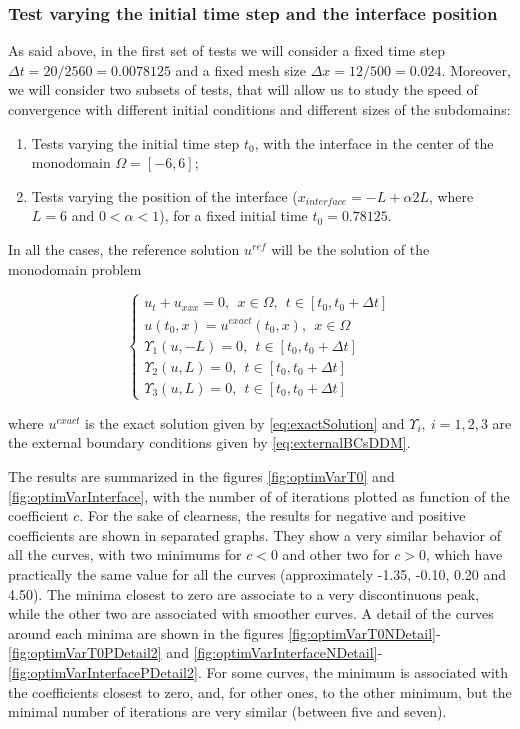 \subsubsection{Test varying the initial time step and the interface position}

\indent As said above, in the first set of tests we will consider a fixed time step $\Delta t = 20/2560 = 0.0078125$ and a fixed mesh size $\Delta x = 12/500 = 0.024$. Moreover, we will consider two subsets of tests, that will allow us to study the speed of convergence with different initial conditions and different sizes of the subdomains:

\begin{enumerate}
	\item Tests varying the initial time step $t_0$, with the interface in the center of the monodomain $\Omega = [-6,6]$;
	\item Tests varying the position of the interface ($x_{interface} = -L + \alpha 2L$, where $L = 6$ and $0 < \alpha < 1$), for a fixed initial time $t_0 = 0.78125$.
\end{enumerate}

\indent In all the cases, the reference solution $u^{ref}$ will be the solution of the monodomain problem

\begin{equation*}
	\begin{cases}
	u_t + u_{xxx} = 0, \ \ x \in \Omega, \ \ t \in [t_0, t_0+\Delta t] \\
	u(t_0,x) = u^{exact}(t_0,x) , \ \ x \in \Omega \\ 
	\Upsilon_1(u,-L) = 0, \ \ t \in [t_0, t_0+\Delta t] \\
	\Upsilon_2(u,L) = 0, \ \ t \in [t_0, t_0+\Delta t] \\
	\Upsilon_3(u,L) = 0, \ \ t \in [t_0, t_0+\Delta t]
	\end{cases}
\end{equation*}

\noindent where $u^{exact}$ is the exact solution given by \eqref{eq:exactSolution} and $\Upsilon_i , \ i =1,2,3$ are the external boundary conditions given by \eqref{eq:externalBCsDDM}.

\indent The results are summarized in the figures \ref{fig:optimVarT0} and \ref{fig:optimVarInterface}, with the number of of iterations plotted as function of the coefficient $c$. For the sake of clearness, the results for negative and positive coefficients are shown in separated graphs. They show a very similar behavior of all the curves, with two minimums for $c < 0$ and other two for $c>0$, which have practically the same value for all the curves (approximately -1.35, -0.10, 0.20 and 4.50). The minima closest to zero are associate to a very discontinuous peak, while the other two are associated with smoother curves. A detail of the curves around each minima are shown in the figures \ref{fig:optimVarT0NDetail}-\ref{fig:optimVarT0PDetail2} and \ref{fig:optimVarInterfaceNDetail}-\ref{fig:optimVarInterfacePDetail2}. For some curves, the minimum is associated with the coefficients closest to zero, and, for other ones, to the other minimum, but the minimal number of iterations are very similar (between five and seven).

